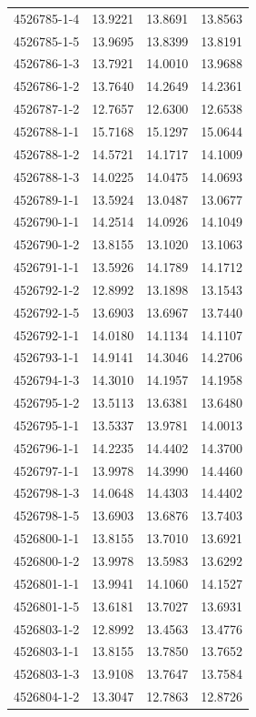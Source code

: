 \begin{longtable}{lrrr}
4526785-1-4 & 13.9221 & 13.8691 & 13.8563 \\
4526785-1-5 & 13.9695 & 13.8399 & 13.8191 \\
4526786-1-3 & 13.7921 & 14.0010 & 13.9688 \\
4526786-1-2 & 13.7640 & 14.2649 & 14.2361 \\
4526787-1-2 & 12.7657 & 12.6300 & 12.6538 \\
4526788-1-1 & 15.7168 & 15.1297 & 15.0644 \\
4526788-1-2 & 14.5721 & 14.1717 & 14.1009 \\
4526788-1-3 & 14.0225 & 14.0475 & 14.0693 \\
4526789-1-1 & 13.5924 & 13.0487 & 13.0677 \\
4526790-1-1 & 14.2514 & 14.0926 & 14.1049 \\
4526790-1-2 & 13.8155 & 13.1020 & 13.1063 \\
4526791-1-1 & 13.5926 & 14.1789 & 14.1712 \\
4526792-1-2 & 12.8992 & 13.1898 & 13.1543 \\
4526792-1-5 & 13.6903 & 13.6967 & 13.7440 \\
4526792-1-1 & 14.0180 & 14.1134 & 14.1107 \\
4526793-1-1 & 14.9141 & 14.3046 & 14.2706 \\
4526794-1-3 & 14.3010 & 14.1957 & 14.1958 \\
4526795-1-2 & 13.5113 & 13.6381 & 13.6480 \\
4526795-1-1 & 13.5337 & 13.9781 & 14.0013 \\
4526796-1-1 & 14.2235 & 14.4402 & 14.3700 \\
4526797-1-1 & 13.9978 & 14.3990 & 14.4460 \\
4526798-1-3 & 14.0648 & 14.4303 & 14.4402 \\
4526798-1-5 & 13.6903 & 13.6876 & 13.7403 \\
4526800-1-1 & 13.8155 & 13.7010 & 13.6921 \\
4526800-1-2 & 13.9978 & 13.5983 & 13.6292 \\
4526801-1-1 & 13.9941 & 14.1060 & 14.1527 \\
4526801-1-5 & 13.6181 & 13.7027 & 13.6931 \\
4526803-1-2 & 12.8992 & 13.4563 & 13.4776 \\
4526803-1-1 & 13.8155 & 13.7850 & 13.7652 \\
4526803-1-3 & 13.9108 & 13.7647 & 13.7584 \\
4526804-1-2 & 13.3047 & 12.7863 & 12.8726 \\

\end{longtable}
